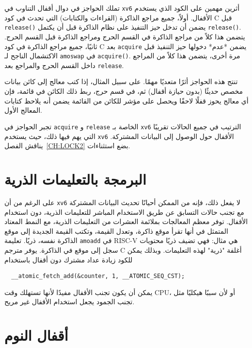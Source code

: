 تملك الحواجز في دوال أقفال التناوب في \texttt{xv6} أثرين مهمين على الكود الذي يستخدم الأقفال.
أولاً، جميع مراجع الذاكرة (القراءات والكتابات) التي تحدث في كود C قبل \lstinline{release()} يضمن أن تدخل حيز التنفيذ على نظام الذاكرة قبل أن يكتمل \lstinline{release()}.
يتضمن هذا كلاً من مراجع الذاكرة في القسم الحرج ومراجع الذاكرة قبل القسم الحرج.
ثانيًا، جميع مراجع الذاكرة في كود C بعد \lstinline{acquire} يضمن *عدم* دخولها حيز التنفيذ قبل الاكتشمال الناجح لـ \lstinline{amoswap} في \lstinline{acquire()}.
مرة أخرى، يتضمن هذا كلاً من المراجع داخل القسم الحرج والمراجع بعد \lstinline{release}.

تنتج هذه الحواجز أثرًا متعديًا مهمًا. على سبيل المثال، إذا كتب معالج إلى كائن بيانات مخصص حديثًا (بدون حيازة أقفال) ثم، في قسم حرج، ربط ذلك الكائن في قائمة، فإن أي معالج يحوز قفلًا لاحقًا ويحصل على مؤشر للكائن من القائمة يضمن أنه يلاحظ كتابات المعالج الأول.

تجبر الحواجز في \lstinline{acquire} و \lstinline{release} الخاصة بـ \texttt{xv6} الترتيب في جميع الحالات تقريبًا التي يهم فيها ذلك، حيث يستخدم \texttt{xv6} الأقفال حول الوصول إلى البيانات المشتركة.
يناقش الفصل~\ref{CH:LOCK2} بضع استثناءات.

\section{البرمجة بالتعليمات الذرية}
\label{sec:programming_atomics}

على الرغم من أن \texttt{xv6} لا يفعل ذلك، فإنه من الممكن أحيانًا تحديث البيانات المشتركة مع تجنب حالات التسابق عن طريق الاستخدام المباشر للتعليمات الذرية، دون استخدام الأقفال.
توفر معظم المعالجات بملائمة العشرات من التعليمات الذرية، مع النمط المعتاد المتمثل في أنها تقرأ موقع ذاكرة، وتعدل القيمة، وتكتب القيمة الجديدة إلى موقع الذاكرة نفسه، ذريًا.
تعليمة \lstinline{amoadd} في RISC-V هي مثال: فهي تضيف ذريًا محتويات سجل إلى موقع في الذاكرة.
يوفر مترجم C أغلفة "ذرية" لهذه التعليمات.
وبذلك يمكن للكود زيادة عداد مشترك دون أقفال باستخدام
\begin{lstlisting}
  __atomic_fetch_add(&counter, 1, __ATOMIC_SEQ_CST);
\end{lstlisting}
يمكن أن يكون تجنب الأقفال مفيدًا لأنها تستهلك وقت CPU، أو لأن سببًا هيكليًا مثل تجنب الجمود يجعل استخدام الأقفال غير مريح.

\section{أقفال النوم}
\label{sec:sleep_locks}


